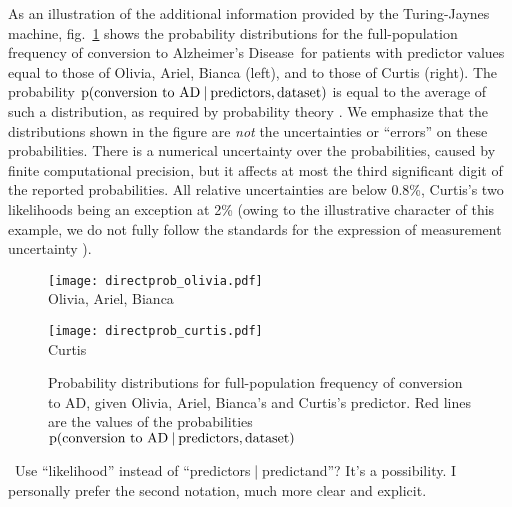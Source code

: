 \documentclass[utf8]{FrontiersinHarvard} %
\newcommand*{\puzzle}{{\fontencoding{U}\fontfamily{fontawesometwo}\selectfont\symbol{225}}}
\newcommand{\mynotez}[1]{{\color{notecolour}\puzzle\ #1}}
\newcommand*{\sects}{\S\S}%
\newcommand*{\fig}{fig.}%
\newcommand*{\eg}{{e.g.}}
\newcommand*{\p}{\mathrm{p}}%
\renewcommand*{\|}[1][]{\nonscript\:#1\vert\nonscript\:\mathopen{}}
\newcommand*{\ad}{Alzheimer's Disease}
\newcommand*{\tjm}{Turing-Jaynes machine}
\begin{document}
\medskip

As an illustration of the additional information provided by the \tjm, \fig~\ref{fig:freq_distribution_patients} shows the probability distributions for the full-population frequency of conversion to \ad\ for patients with predictor values equal to those of Olivia, Ariel, Bianca (left), and to those of Curtis (right). The probability $\p(\text{conversion to AD} \| \text{predictors}, \text{dataset})$ is equal to the average of such a distribution, as required by probability theory \citep[\eg][\sects~4.2--4.3]{bernardoetal1994_r2000}. We emphasize that the distributions shown in the figure are \emph{not} the uncertainties or \enquote{errors} on these probabilities. There is a numerical uncertainty over the probabilities, caused by finite computational precision, but it affects at most the third significant digit of the reported probabilities. All relative uncertainties are below 0.8\%, Curtis's two likelihoods being an exception at 2\% (owing to the illustrative character of this example, we do not fully follow the standards for the expression of measurement uncertainty \citep{jcgm1993_r2008}).

\begin{figure}[!t]%
  \centering%
  \begin{minipage}{0.49\linewidth}\centering
    \texttt{[image: directprob\_olivia.pdf]}\\
    \footnotesize Olivia, Ariel, Bianca
  \end{minipage}
  \hfill
  \begin{minipage}{0.49\linewidth}\centering
    \texttt{[image: directprob\_curtis.pdf]}\\
    \footnotesize Curtis
  \end{minipage}
  \caption{Probability distributions for full-population frequency of conversion to AD, given Olivia, Ariel, Bianca's and Curtis's predictor. Red lines are the values of the probabilities  $\p(\text{conversion to AD} \| \text{predictors}, \text{dataset})$}\label{fig:freq_distribution_patients}
\end{figure}%



\mynotez{Use \enquote{likelihood} instead of \enquote{predictors$\|$predictand}? It's a possibility. I personally prefer the second notation, much more clear and explicit.}



\end{document}
